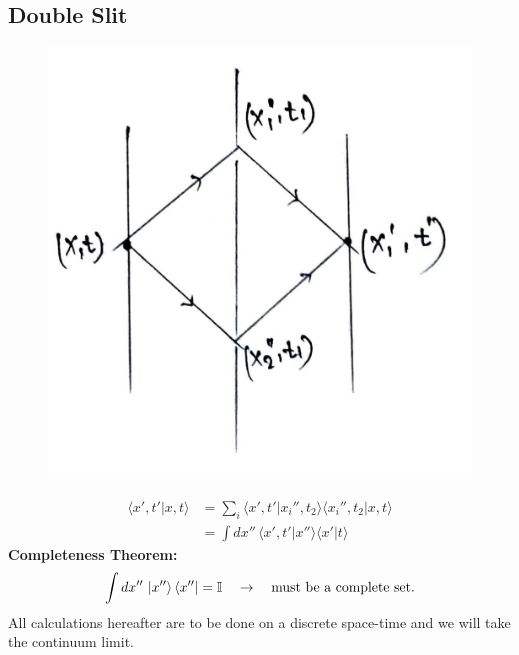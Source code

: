 \documentclass[14pt]{article} %
\begin{document}
\subsection{Double Slit}
\vspace{-1.5cm}
\begin{figure}[H]
    \centering
    \includegraphics[width=0.5\linewidth]{figures/C10_4.jpeg}
    \caption*{}
\end{figure}
\vspace{-2cm}
\begin{align*}
\langle x', t' | x, t \rangle &= \sum_i \langle x', t' | x_i'', t_2 \rangle \langle x_i'', t_2 | x, t \rangle
 \\
&= \int dx'' \, \langle x', t' | x'' \rangle \langle x' | t \rangle
\end{align*}
\textbf{Completeness Theorem:}
\begin{align*}
\int dx'' \, \ket{x''} \bra{x''} = \mathbb{I} \quad \to \quad \text{must be a complete set.}
\end{align*}
All calculations hereafter are to be done on a discrete space-time and we will take the continuum limit.\\
\end{document}
